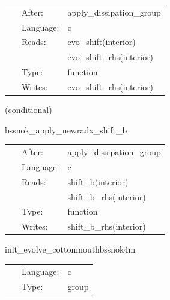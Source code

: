 \documentclass{article}
\begin{document}
 \begin{tabular*}{160mm}{cll} 
~ & After:  & apply\_dissipation\_group \\ 
~ & Language:  & c \\ 
~ & Reads:  & evo\_shift(interior) \\ 
~& ~ &evo\_shift\_rhs(interior)\\ 
~ & Type:  & function \\ 
~ & Writes:  & evo\_shift\_rhs(interior) \\ 
\end{tabular*} 


\vspace{5mm}

   (conditional) 

\hspace{5mm} bssnok\_apply\_newradx\_shift\_b 



\hspace{5mm}

 \begin{tabular*}{160mm}{cll} 
~ & After:  & apply\_dissipation\_group \\ 
~ & Language:  & c \\ 
~ & Reads:  & shift\_b(interior) \\ 
~& ~ &shift\_b\_rhs(interior)\\ 
~ & Type:  & function \\ 
~ & Writes:  & shift\_b\_rhs(interior) \\ 
\end{tabular*} 


\vspace{5mm}


\hspace{5mm} init\_evolve\_cottonmouthbssnok4m 

\hspace{5mm}{\it group containing all functions from evolve that should run before step 0. generated by einsteinengine. } 


\hspace{5mm}

 \begin{tabular*}{160mm}{cll} 
~ & Language:  & c \\ 
~ & Type:  & group \\ 
\end{tabular*} 
\end{document}
